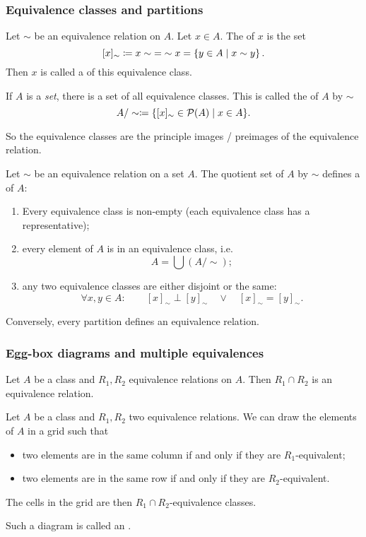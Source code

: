 \subsubsection{Equivalence classes and partitions}
\begin{definition}
Let $\sim$ be an equivalence relation on $A$. Let $x\in A$. The  of $x$ is the set
\[ [x]_\sim \coloneqq x\sim \; = \; \sim x = \left\{ y\in A \;\middle|\; x\sim y \right\}. \]
Then $x$ is called a  of this equivalence class.

If $A$ is a \emph{set}, there is a set of all equivalence classes. This is called the  of $A$ by $\sim$
\[ A/\sim \coloneqq \{ [x]_\sim \in \operatorname{\mathcal{P}}(A) \;|\; x\in A \}. \]
\end{definition}
So the equivalence classes are the principle images / preimages of the equivalence relation.

\begin{proposition}
Let $\sim$ be an equivalence relation on a set $A$. The quotient set of $A$ by $\sim$ defines a  of $A$:
\begin{enumerate}
\item Every equivalence class is non-empty (each equivalence class has a representative);
\item every element of $A$ is in an equivalence class, i.e.\
\[ A = \bigcup (A/\sim); \]
\item any two equivalence classes are either disjoint or the same:
\[ \forall x,y\in A: \qquad[x]_\sim \perp [y]_\sim \quad \lor \quad [x]_\sim = [y]_\sim. \]
\end{enumerate}
Conversely, every partition defines an equivalence relation.
\end{proposition}

\subsubsection{Egg-box diagrams and multiple equivalences}
\begin{lemma}
Let $A$ be a class and $R_1, R_2$ equivalence relations on $A$. Then $R_1 \cap R_2$ is an equivalence relation.
\end{lemma}

\begin{definition}
Let $A$ be a class and $R_1, R_2$ two equivalence relations. We can draw the elements of $A$ in a grid such that
\begin{itemize}
\item two elements are in the same column \textup{if and only if} they are $R_1$-equivalent;
\item two elements are in the same row \textup{if and only if} they are $R_2$-equivalent.
\end{itemize}
The cells in the grid are then $R_1\cap R_2$-equivalence classes.

Such a diagram is called an .
\end{definition}

